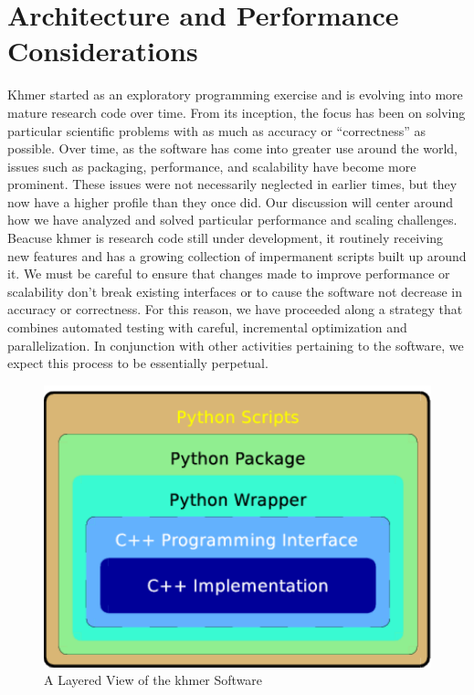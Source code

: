 \documentclass{article}
\begin{document}
\section{Architecture and Performance Considerations}

Khmer started as an exploratory programming exercise and is evolving into
more mature research code over time.
From its inception, the focus has been on solving
particular scientific problems with as much as accuracy or ``correctness'' as
possible. Over time, as the software has come into greater use around the
world, issues such as packaging, performance, and scalability have become more
prominent. These issues were not necessarily neglected in earlier times, but
they now have a higher profile than they once did. Our discussion will center
around how we have analyzed and solved particular performance and scaling
challenges.
Beacuse khmer is research code still under development, it routinely
receiving new features and
has a growing collection of impermanent scripts built up around it.  We must
be careful to ensure that changes made to
improve performance or scalability don't break existing
interfaces or to cause the software not decrease in accuracy or
correctness. For this reason, we have proceeded along a strategy that
combines automated testing with careful,
incremental optimization and parallelization. In conjunction with other
activities pertaining to the software, we expect this process to be essentially perpetual.

\begin{figure}[ht!]
\centering
\includegraphics[scale=0.6]{layers.pdf}
\caption{A Layered View of the khmer Software}
\label{khmerLayers}
\end{figure}
\end{document}

